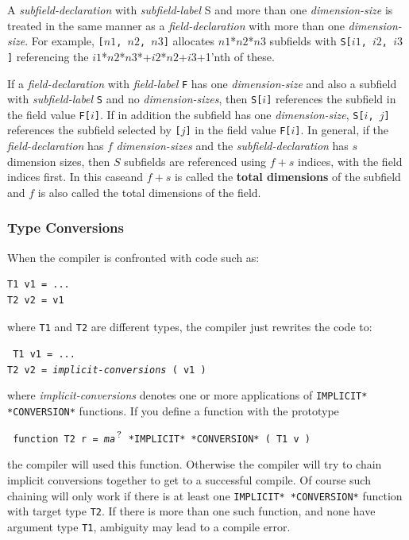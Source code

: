 \documentclass[12pt]{article}
\newcommand{\QMARK}{{$^{\,\mbox{\footnotesize ?}}$}}
\newcommand{\key}[1]{{\rm \bfseries #1}}
\newcommand{\EOL}{\penalty \exhyphenpenalty}
\newenvironment{indpar}[1][0.3in]%
	{\begin{list}{}%
		     {\setlength{\itemsep}{0in}%
		      \setlength{\topsep}{0in}%
		      \setlength{\parsep}{1ex}%
		      \setlength{\labelwidth}{#1}%
		      \setlength{\leftmargin}{#1}%
		      \addtolength{\leftmargin}{\labelsep}}%
	 \item}%
	{\end{list}}
\begin{document}
A {\em subfield-declaration} with {\em subfield-label} S
and more than one {\em dimension-size} is
treated in the same manner as a {\em field-declaration} with
more than one {\em dimension-size}.  For example,
{\tt [$n1$, $n2$, $n3$]} allocates $n1$*$n2$*$n3$ subfields with
{\tt S[$i1$, $i2$, $i3$]} referencing the
$i1$*$n2$*$n3$*+\EOL $i2$*$n2$+\EOL $i3$+1'nth of these.

If a {\em field-declaration} with {\em field-label} {\tt F}
has one {\em dimension-size}
and also a subfield with {\em subfield-label} {\tt S} and no
{\em dimension-sizes}, then
{\tt S[$i$]} references the subfield in the field value {\tt F[$i$]}.
If in addition the subfield has one {\em dimension-size},
{\tt S[$i$, $j$]} references the subfield selected by {\tt [$j$]}
in the field value {\tt F[$i$]}.
In general, if the {\em field-declaration} has $f$ {\em dimension-sizes}
and the {\em subfield-declaration} has $s$ dimension sizes,
then $S$ subfields are referenced using $f+s$ indices, with the
field indices first.  In this caseand $f+s$ is called the
\key{total dimensions}\label{TOTAL-DIMENSIONS}
of the subfield and $f$ is also called the total dimensions of the field.

\subsubsection{Type Conversions}
\label{TYPE-CONVERSIONS}

When the compiler is confronted with code such as:
\begin{indpar}\begin{verbatim}
T1 v1 = ...
T2 v2 = v1
\end{verbatim}\end{indpar}
where {\tt T1} and {\tt T2} are different types,
the compiler just rewrites the code to:
\begin{indpar}\tt
T1 v1 = ... \\
T2 v2 = {\rm \em implicit-conversions} ( v1 )
\end{indpar}
where {\em implicit-conversions} denotes one or more applications
of {\tt *IMPLICIT* *CONVERSION*} functions.
If you define a function
with the prototype
\begin{indpar} \tt
function T2 r = {\em ma}\QMARK{} *IMPLICIT* *CONVERSION* ( T1 v )
\end{indpar}
the compiler will used this function.  Otherwise the compiler
will try to chain implicit conversions together to get to a
successful compile.  Of course such chaining will only work
if there is at least one {\tt *IMPLICIT* *CONVERSION*} function with
target type {\tt T2}.  If there is more than one such function,
and none have argument type {\tt T1}, ambiguity may lead to a compile error.
\end{document}
